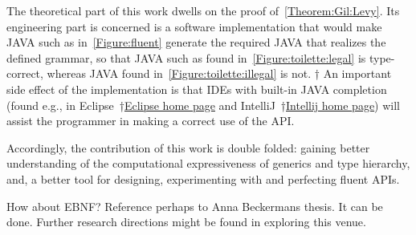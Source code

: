 The theoretical part of this work dwells on the proof of~\cref{Theorem:Gil:Levy}.
Its engineering part is concerned is
  a software implementation that would make JAVA
  such as in~\cref{Figure:fluent} generate
  the required \Java JAVA that realizes the
  defined grammar, so that JAVA such as
  found in~\cref{Figure:toilette:legal} is type-correct,
  whereas JAVA found in~\cref{Figure:toilette:illegal} is not.	
†{%
An important side effect of the implementation is that IDEs with built-in JAVA
completion
 (found e.g., in Eclipse~†{\href{http://www.eclipse.org/}{Eclipse home page}} and IntelliJ~†{\href{https://www.jetbrains.com/idea/}{Intellij home page}})
 will assist the programmer in making a correct use of the API.
 }

Accordingly, the contribution of this work is double folded:
  gaining better understanding of the computational expressiveness of
  \Java generics and type hierarchy, and, a better tool
  for designing, experimenting with and perfecting fluent APIs.

How about EBNF\@? Reference perhaps to Anna Beckermans thesis.\cite{Tomer:also try to trace citations from wikipedia}
It can be done. Further research directions might be found in exploring this venue. 
